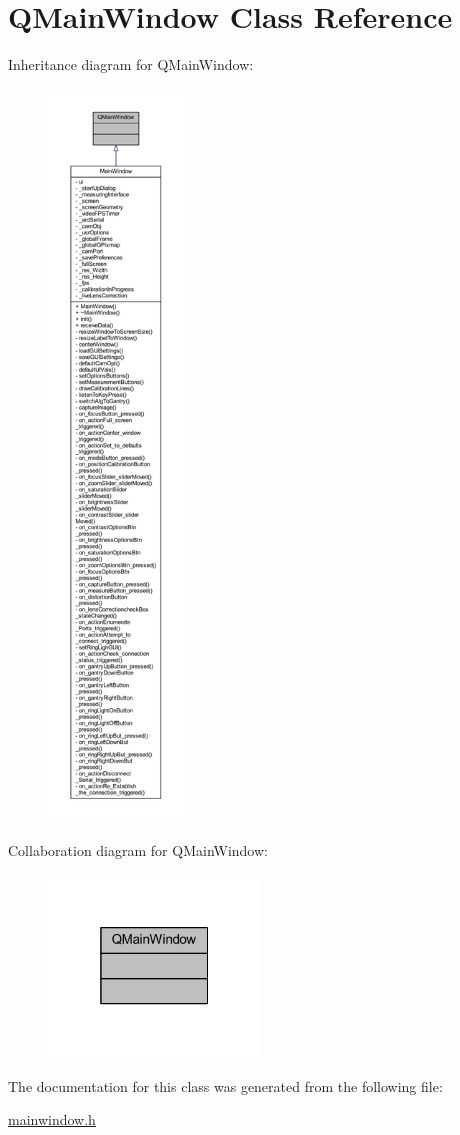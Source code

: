\hypertarget{classQMainWindow}{}\section{Q\+Main\+Window Class Reference}
\label{classQMainWindow}


Inheritance diagram for Q\+Main\+Window\+:
\nopagebreak
\begin{figure}[H]
\begin{center}
\leavevmode
\includegraphics[height=550pt]{classQMainWindow__inherit__graph}
\end{center}
\end{figure}


Collaboration diagram for Q\+Main\+Window\+:
\nopagebreak
\begin{figure}[H]
\begin{center}
\leavevmode
\includegraphics[width=160pt]{classQMainWindow__coll__graph}
\end{center}
\end{figure}


The documentation for this class was generated from the following file\+:\begin{DoxyCompactItemize}
\item 
\mbox{\hyperlink{mainwindow_8h}{mainwindow.\+h}}\end{DoxyCompactItemize}
